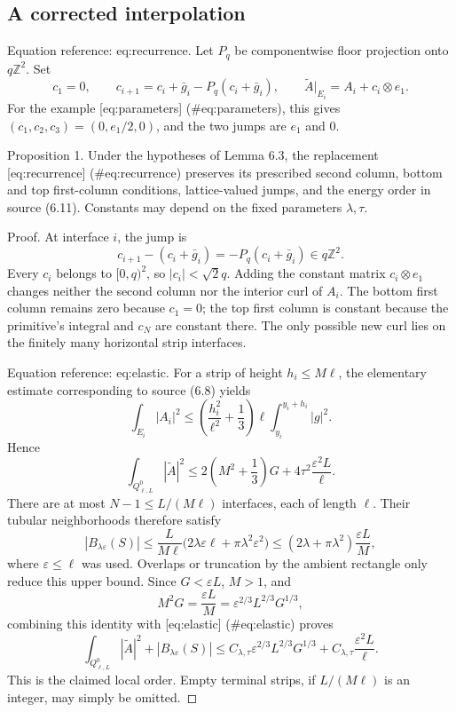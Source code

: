 \documentclass[10pt]{article}
\begin{document}
\subsection*{A corrected interpolation}
Equation reference: eq:recurrence. Let \(P_q\) be componentwise floor projection onto \(q\mathbb Z^2\). Set \[
 c_1=0,\qquad
 c_{i+1}=c_i+\bar g_i-P_q(c_i+\bar g_i),\qquad
 \widetilde A|_{E_i}=A_i+c_i\otimes e_1.\] For the example [eq:parameters] (\#eq:parameters), this gives \((c_1,c_2,c_3)=(0,e_1/2,0)\), and the two jumps are \(e_1\) and \(0\).\par
Proposition 1.  Under the hypotheses of Lemma 6.3, the replacement [eq:recurrence] (\#eq:recurrence) preserves its prescribed second column, bottom and top first-column conditions, lattice-valued jumps, and the energy order in source (6.11). Constants may depend on the fixed parameters \(\lambda,\tau\).\par
Proof. At interface \(i\), the jump is \[c_{i+1}-(c_i+\bar g_i)
   =-P_q(c_i+\bar g_i)\in q\mathbb Z^2.\] Every \(c_i\) belongs to \([0,q)^2\), so \(|c_i|<\sqrt2q\). Adding the constant matrix \(c_i\otimes e_1\) changes neither the second column nor the interior curl of \(A_i\). The bottom first column remains zero because \(c_1=0\); the top first column is constant because the primitive’s integral and \(c_N\) are constant there. The only possible new curl lies on the finitely many horizontal strip interfaces.\par
Equation reference: eq:elastic. For a strip of height \(h_i\le M\ell\), the elementary estimate corresponding to source (6.8) yields \[\int_{E_i}|A_i|^2
 \le \left(\frac{h_i^2}{\ell^2}+\frac13\right)
        \ell\int_{y_i}^{y_i+h_i}|g|^2.\] Hence \[
 \int_{Q_{\ell,L}^0}|\widetilde A|^2
 \le 2\left(M^2+\frac13\right)G
       +4\tau^2\frac{\varepsilon^2L}{\ell}.\] There are at most \(N-1\le L/(M\ell)\) interfaces, each of length \(\ell\). Their tubular neighborhoods therefore satisfy \[|B_{\lambda\varepsilon}(S)|
 \le \frac{L}{M\ell}
       \bigl(2\lambda\varepsilon\ell+\pi\lambda^2\varepsilon^2\bigr)
 \le (2\lambda+\pi\lambda^2)\frac{\varepsilon L}{M},\] where \(\varepsilon\le\ell\) was used. Overlaps or truncation by the ambient rectangle only reduce this upper bound. Since \(G<\varepsilon L\), \(M>1\), and \[M^2G=\frac{\varepsilon L}{M}
       =\varepsilon^{2/3}L^{2/3}G^{1/3},\] combining this identity with [eq:elastic] (\#eq:elastic) proves \[\int_{Q_{\ell,L}^0}|\widetilde A|^2+|B_{\lambda\varepsilon}(S)|
 \le C_{\lambda,\tau}
       \varepsilon^{2/3}L^{2/3}G^{1/3}
       +C_{\lambda,\tau}\frac{\varepsilon^2L}{\ell}.\] This is the claimed local order. Empty terminal strips, if \(L/(M\ell)\) is an integer, may simply be omitted. ◻\par
\end{document}
